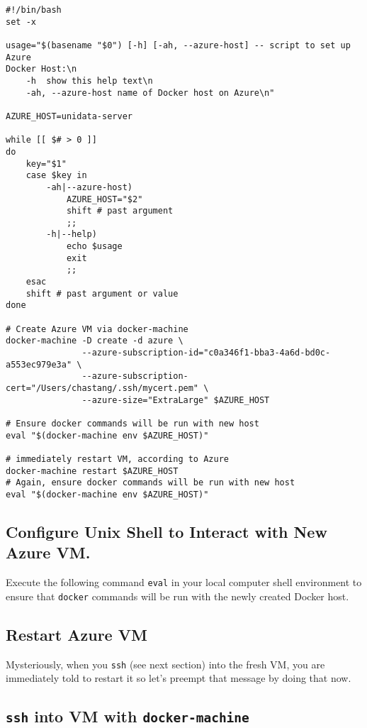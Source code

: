 \documentclass[11pt]{article}
\begin{document}
\begin{verbatim}
#!/bin/bash
set -x 

usage="$(basename "$0") [-h] [-ah, --azure-host] -- script to set up Azure 
Docker Host:\n
    -h  show this help text\n
    -ah, --azure-host name of Docker host on Azure\n"

AZURE_HOST=unidata-server

while [[ $# > 0 ]]
do
    key="$1"
    case $key in
        -ah|--azure-host)
            AZURE_HOST="$2"
            shift # past argument
            ;;
        -h|--help)
            echo $usage
            exit
            ;;
    esac
    shift # past argument or value
done

# Create Azure VM via docker-machine
docker-machine -D create -d azure \
               --azure-subscription-id="c0a346f1-bba3-4a6d-bd0c-a553ec979e3a" \
               --azure-subscription-cert="/Users/chastang/.ssh/mycert.pem" \
               --azure-size="ExtraLarge" $AZURE_HOST

# Ensure docker commands will be run with new host
eval "$(docker-machine env $AZURE_HOST)"

# immediately restart VM, according to Azure
docker-machine restart $AZURE_HOST
# Again, ensure docker commands will be run with new host
eval "$(docker-machine env $AZURE_HOST)"
\end{verbatim}

\subsection{Configure Unix Shell to Interact with New Azure VM.}
\label{sec:orgheadline5}

Execute the following command \texttt{eval} in your local computer shell environment to ensure that \texttt{docker} commands will be run with the newly created Docker host.

\subsection{Restart Azure VM}
\label{sec:orgheadline6}

Mysteriously, when you \texttt{ssh} (see next section) into the fresh VM, you are immediately told to restart it so let's preempt that message by doing that now.

\subsection{\texttt{ssh} into VM with \texttt{docker-machine}}
\label{sec:orgheadline7}
\end{document}
